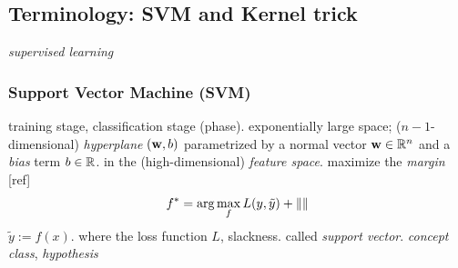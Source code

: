 \subsection{Terminology: SVM and Kernel trick}\label{sec:svm}
\emph{supervised learning} 

\subsubsection{Support Vector Machine (SVM)}
training stage, classification stage (phase).
\cite{cortesSupportvectorNetworks1995}
exponentially large space;
($n-1$-dimensional) \emph{hyperplane} $(\vb{w},b)$ parametrized by a normal vector $\vb{w}\in\mathbb{R}^n$ and a \emph{bias} term $b\in\mathbb{R}$. in the (high-dimensional) \emph{feature space}.
maximize the \emph{margin} [ref]
\begin{equation}
	f^* = \arg \max_f  L(y,\tilde{y}) + \norm{}
\end{equation}
$\tilde{y}:=f(x)$.
where the loss function $L$, slackness. called \emph{support vector}.
\emph{concept class}, \emph{hypothesis}


